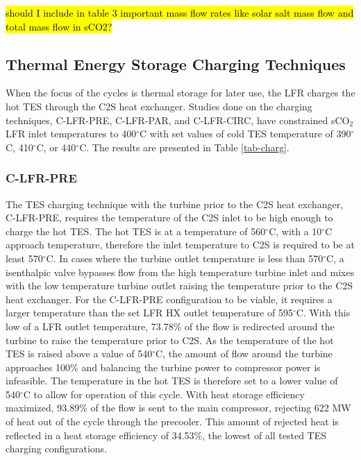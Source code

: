 \begin{paracol}{2}
\hl{should I include in table 3 important mass flow rates like solar salt mass flow and total mass flow in sCO2?}

\subsection{Thermal Energy Storage Charging Techniques}

When the focus of the cycles is thermal storage for later use, the LFR charges the hot TES through the C2S heat exchanger. Studies done on the charging techniques, C-LFR-PRE, C-LFR-PAR, and C-LFR-CIRC, have constrained sCO$_2$ LFR inlet temperatures to 400$^{\circ}$C with set values of cold TES temperature of 390$^{\circ}$C, 410$^{\circ}$C, or 440$^{\circ}$C. The results are presented in Table \ref{tab-charg}. 

\subsubsection{C-LFR-PRE}
The TES charging technique with the turbine prior to the C2S heat exchanger, C-LFR-PRE, requires the temperature of the C2S inlet to be high enough to charge the hot TES. The hot TES is at a temperature of 560$^{\circ}$C, with a 10$^{\circ}$C approach temperature, therefore the inlet temperature to C2S is required to be at least 570$^{\circ}$C. In cases where the turbine outlet temperature is less than 570$^{\circ}$C, a isenthalpic valve bypasses flow from the high temperature turbine inlet and mixes with the low temperature turbine outlet raising the temperature prior to the C2S heat exchanger. For the C-LFR-PRE configuration to be viable, it requires a larger temperature than the set LFR HX outlet temperature of 595$^{\circ}$C. With this low of a LFR outlet temperature, 73.78\% of the flow is redirected around the turbine to raise the temperature prior to C2S. As the temperature of the hot TES is raised above a value of 540$^{\circ}$C, the amount of flow around the turbine approaches 100\% and balancing the turbine power to compressor power is infeasible. The temperature in the hot TES is therefore set to a lower value of 540$^{\circ}$C to allow for operation of this cycle. With heat storage efficiency maximized, 93.89\% of the flow is sent to the main compressor, rejecting 622 MW of heat out of the cycle through the precooler. This amount of rejected heat is reflected in a heat storage efficiency of 34.53\%, the lowest of all tested TES charging configurations.



\end{paracol}
